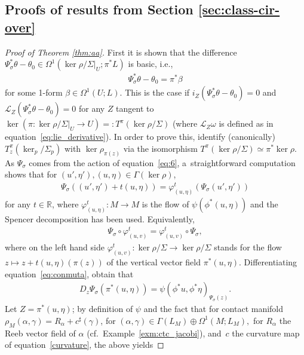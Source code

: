 \documentclass[pdftex]{sigma}
\numberwithin{equation}{section}
\newcommand{\RR}{\mathbb{R}}
\begin{document}
\subsection*{Proofs of results from Section \ref{sec:class-cir-over}}
\begin{proof}[Proof of Theorem \ref{thm:aa}] First it is shown that the dif\/ference $\Psi_\sigma^*\theta-\theta_0\in\Omega^1(\ker\rho/\Sigma|_U;\pi^*L)$
is basic, i.e.,
\begin{gather}\label{eqn:contact form}
\Psi_\sigma^*\theta-\theta_0=\pi^*\beta
\end{gather}
for some 1-form $\beta\in\Omega^1(U;L)$. This is the case if $i_Z(\Psi_\sigma^*\theta-\theta_0)=0$ and $\mathcal{L}_Z(\Psi_\sigma^*\theta-\theta_0)=0$ for any $Z$ tangent to $\ker(\pi\colon \ker\rho/\Sigma|_U\to U) =: T^{\pi}(\ker \rho/\Sigma)$ (where $\mathcal{L}_Z\omega$ is
def\/ined as in equation~\eqref{eq:lie_derivative}). In order to prove this, identify (canonically) $T^\pi_{z}(\ker_{p}/\Sigma_p)$ with $\ker\rho_{\pi(z)}$ via the isomorphism $T^\pi(\ker\rho/\Sigma)\simeq \pi^*\ker\rho$. As $\Psi_\sigma$ comes from the action of equation~\eqref{eq:6}, a~straightforward computation shows that for $(u',\eta'),(u,\eta)\in \Gamma(\ker\rho)$,
\begin{gather*}
 \Psi_\sigma((u',\eta')+t(u,\eta))=\varphi^t_{(u,\eta)}(\Psi_\sigma(u',\eta'))
\end{gather*}
for any $t\in\RR$, where $\varphi^t_{(u,\eta)} \colon M\to M$ is the f\/low of $\psi(\phi^*(u,\eta))$ and the Spencer decomposition has been used. Equivalently,
\begin{gather}\label{eq:conmuta}\Psi_\sigma\circ \varphi^t_{(u,v)}=\varphi^t_{(u,v)}\circ\Psi_\sigma,\end{gather}
where on the left hand side $\varphi^t_{(u,v)}\colon \ker\rho/\Sigma\to\ker\rho/\Sigma$ stands for the f\/low $z\mapsto z+t(u,\eta)(\pi(z))$ of the vertical vector f\/ield $\pi^*(u,\eta)$. Dif\/ferentiating equation~\eqref{eq:conmuta}, obtain that
\begin{gather*}
 D_{z}\Psi_\sigma(\pi^*(u,\eta))=\psi(\phi^*u,\phi^*\eta)_{\Psi_\sigma(z)}.
\end{gather*}
Let $Z=\pi^*(u,\eta)$; by def\/inition of $\psi$ and the fact that for contact manifold $\rho_M(\alpha,\gamma)=R_\alpha+c^\sharp(\gamma)$, for $(\alpha,\gamma)\in\Gamma(L_M)\oplus\Omega^1(M;L_M),$ for $R_\alpha$ the Reeb vector f\/ield of $\alpha$ (cf.\ Example~\ref{exm:ctc_jacobi}), and~$c$ the curvature map of equation~\eqref{curvature}, the above yields

\end{proof}
\end{document}
